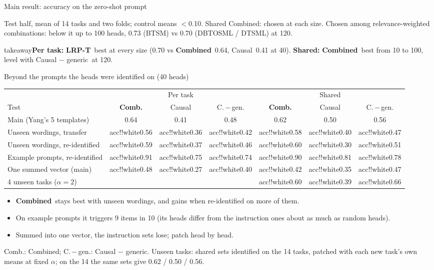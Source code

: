 \documentclass[aspectratio=169,11pt,xcolor=table]{beamer}
\newcommand{\takeaway}[1]{\vfill
  \begin{beamercolorbox}[wd=\textwidth,sep=6pt]{takeaway}\small #1\end{beamercolorbox}}
\newcommand{\cv}[1]{\pgfmathtruncatemacro{\cvshade}{#1*70}\edef\cvcmd{\noexpand\cellcolor{acc!\cvshade!white}}\cvcmd#1}
\newcommand{\Sel}{\textcolor{cSel}{\textbf{Combined}}}
\newcommand{\Causal}{\textcolor{cCaus}{Causal}}
\newcommand{\CausalG}{\textcolor{cCausG}{Causal $-$ generic}}
\newcommand{\LRPT}{\textcolor{cLRP}{\textbf{LRP-T}}}
\begin{document}
\begin{frame}{Main result: accuracy on the zero-shot prompt}
\vspace{0.2em}
\raggedright\footnotesize\color{gray}
Test half, mean of 14 tasks and two folds; control means $<$0.10. Shared Combined: chosen at each size.
Chosen among relevance-weighted combinations: below it up to 100 heads, 0.73 (BTSM) vs 0.70 (DBTOSML / DTSML) at 120.
\takeaway{\textbf{Per task:} \LRPT\ best at every size (0.70 vs \Sel\ 0.64, \Causal\ 0.41 at 40).\quad
\textbf{Shared:} \Sel\ best from 10 to 100, level with \CausalG\ at 120.}
\end{frame}

\begin{frame}{Beyond the prompts the heads were identified on (40 heads)}
\centering\small
\newcommand{\hS}{\textcolor{cSel}{\textbf{Comb.}}}\newcommand{\hC}{\textcolor{cCaus}{Causal}}\newcommand{\hG}{\textcolor{cCausG}{C.\,$-$\,gen.}}
\begin{tabular}{@{}lccc@{\hspace{1.5em}}ccc@{}}
\toprule
 & \multicolumn{3}{c}{Per task} & \multicolumn{3}{c}{Shared} \\
\cmidrule(lr){2-4}\cmidrule(lr){5-7}
Test & \hS & \hC & \hG & \hS & \hC & \hG \\
\midrule
Main (Yang's 5 templates) & \cv{0.64} & \cv{0.41} & \cv{0.48} & \cv{0.62} & \cv{0.50} & \cv{0.56} \\
Unseen wordings, transfer & \cv{0.56} & \cv{0.36} & \cv{0.42} & \cv{0.58} & \cv{0.40} & \cv{0.47} \\
Unseen wordings, re-identified & \cv{0.59} & \cv{0.37} & \cv{0.46} & \cv{0.60} & \cv{0.30} & \cv{0.51} \\
Example prompts, re-identified & \cv{0.91} & \cv{0.75} & \cv{0.74} & \cv{0.90} & \cv{0.81} & \cv{0.78} \\
One summed vector (main) & \cv{0.48} & \cv{0.27} & \cv{0.40} & \cv{0.42} & \cv{0.35} & \cv{0.47} \\
4 unseen tasks ($\alpha=2$) & & & & \cv{0.60} & \cv{0.39} & \cv{0.66} \\
\bottomrule
\end{tabular}

\vspace{0.8em}
\raggedright\small
\begin{itemize}
\item \Sel\ stays best with unseen wordings, and gains when re-identified on more of them.
\item On example prompts it triggers 9 items in 10 (its heads differ from the instruction ones about as much as random heads).
\item Summed into one vector, the instruction sets lose; patch head by head.
\end{itemize}
\vfill
\footnotesize\color{gray} Comb.: Combined; C.\,$-$\,gen.: Causal $-$ generic. Unseen tasks: shared sets identified on the 14 tasks,
patched with each new task's own means at fixed $\alpha$; on the 14 the same sets give 0.62 / 0.50 / 0.56.
\end{frame}
\end{document}
